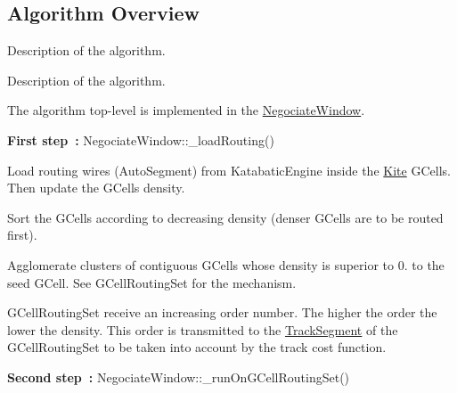 \hypertarget{group__AlgorithmOverview}{}\subsection{Algorithm Overview}
\label{group__AlgorithmOverview}


Description of the algorithm.  


Description of the algorithm. 

The algorithm top-\/level is implemented in the {\ttfamily \mbox{\hyperlink{classKite_1_1NegociateWindow}{Negociate\+Window}}}.

{\bfseries First step~\+:} Negociate\+Window\+::\+\_\+load\+Routing() 
\begin{DoxyEnumerate}
\item Load routing wires ({\ttfamily Auto\+Segment}) from {\ttfamily Katabatic\+Engine} inside the \mbox{\hyperlink{namespaceKite}{Kite}} {\ttfamily G\+Cell\textquotesingle{}s}. Then update the {\ttfamily G\+Cell\textquotesingle{}s} density. 
\item Sort the {\ttfamily G\+Cell\textquotesingle{}s} according to decreasing density (denser {\ttfamily G\+Cell\textquotesingle{}s} are to be routed first). 
\item Agglomerate clusters of contiguous G\+Cell\textquotesingle{}s whose density is superior to 0. to the seed G\+Cell. See {\ttfamily G\+Cell\+Routing\+Set} for the mechanism.

G\+Cell\+Routing\+Set receive an increasing order number. The higher the order the lower the density. This order is transmitted to the {\ttfamily \mbox{\hyperlink{classKite_1_1TrackSegment}{Track\+Segment}}} of the {\ttfamily G\+Cell\+Routing\+Set} to be taken into account by the track cost function. 
\end{DoxyEnumerate}

{\bfseries Second step~\+:} {\ttfamily Negociate\+Window\+::\+\_\+run\+On\+G\+Cell\+Routing\+Set()} 

